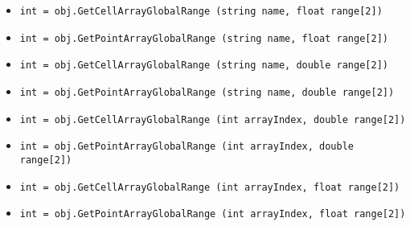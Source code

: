 \begin{itemize}
\item  \verb|int = obj.GetCellArrayGlobalRange (string name, float range[2])|

\item  \verb|int = obj.GetPointArrayGlobalRange (string name, float range[2])|

\item  \verb|int = obj.GetCellArrayGlobalRange (string name, double range[2])|

\item  \verb|int = obj.GetPointArrayGlobalRange (string name, double range[2])|

\item  \verb|int = obj.GetCellArrayGlobalRange (int arrayIndex, double range[2])|

\item  \verb|int = obj.GetPointArrayGlobalRange (int arrayIndex, double range[2])|

\item  \verb|int = obj.GetCellArrayGlobalRange (int arrayIndex, float range[2])|

\item  \verb|int = obj.GetPointArrayGlobalRange (int arrayIndex, float range[2])|

\end{itemize}
